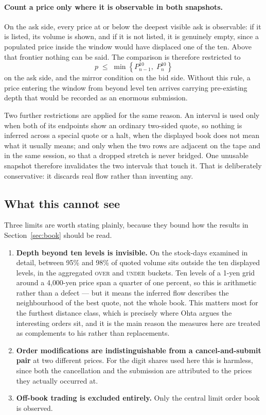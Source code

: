 \paragraph{Count a price only where it is observable in both snapshots.}
On the ask side, every price at or below the deepest visible ask is observable:
if it is listed, its volume is shown, and if it is not listed, it is genuinely
empty, since a populated price inside the window would have displaced one of the
ten. Above that frontier nothing can be said. The comparison is therefore
restricted to
%
\[
p \;\le\; \min\!\left\{P^{10}_{n-1},\; P^{10}_{n}\right\}
\]
%
on the ask side, and the mirror condition on the bid side. Without this rule, a
price entering the window from beyond level ten arrives carrying pre-existing
depth that would be recorded as an enormous submission.

Two further restrictions are applied for the same reason. An interval is used
only when both of its endpoints show an ordinary two-sided quote, so nothing is
inferred across a special quote or a halt, when the displayed book does not mean
what it usually means; and only when the two rows are adjacent on the tape and in
the same session, so that a dropped stretch is never bridged. One unusable
snapshot therefore invalidates the two intervals that touch it. That is
deliberately conservative: it discards real flow rather than inventing any.

\subsection{What this cannot see}

Three limits are worth stating plainly, because they bound how the results in
Section~\ref{sec:book} should be read.

\begin{enumerate}[nosep]
\item \textbf{Depth beyond ten levels is invisible.} On the stock-days examined
      in detail, between 95\% and 98\% of quoted volume sits outside the ten
      displayed levels, in the aggregated \textsc{over} and \textsc{under}
      buckets. Ten levels of a 1-yen grid around a 4{,}000-yen price span a
      quarter of one percent, so this is arithmetic rather than a defect --- but
      it means the inferred flow describes the neighbourhood of the best quote,
      not the whole book. This matters most for the furthest distance class,
      which is precisely where Ohta argues the interesting orders sit, and it is
      the main reason the measures here are treated as complements to his rather
      than replacements.
\item \textbf{Order modifications are indistinguishable from a cancel-and-submit
      pair} at two different prices. For the digit shares used here this is
      harmless, since both the cancellation and the submission are attributed to
      the prices they actually occurred at.
\item \textbf{Off-book trading is excluded entirely.} Only the central limit
      order book is observed.
\end{enumerate}

